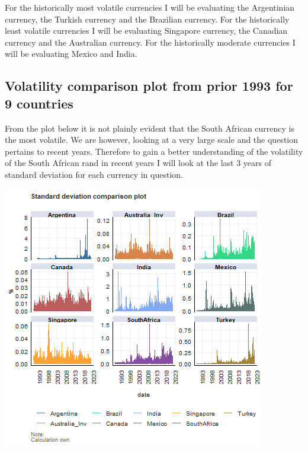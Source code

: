 \documentclass[11pt,preprint, authoryear]{elsarticle}
\let\origfigure\figure
\let\endorigfigure\endfigure
\renewenvironment{figure}[1][2] {
    \expandafter\origfigure\expandafter[H]
} {
    \endorigfigure
}
\numberwithin{equation}{section}
\numberwithin{figure}{section}
\numberwithin{table}{section}
\begin{document}
For the historically most volatile currencies I will be evaluating the
Argentinian currency, the Turkish currency and the Brazilian currency.
For the historically least volatile currencies I will be evaluating
Singapore currency, the Canadian currency and the Australian currency.
For the historically moderate currencies I will be evaluating Mexico and
India.

\hypertarget{volatility-comparison-plot-from-prior-1993-for-9-countries}{%
\subsection{Volatility comparison plot from prior 1993 for 9
countries}\label{volatility-comparison-plot-from-prior-1993-for-9-countries}}

From the plot below it is not plainly evident that the South African
currency is the most volatile. We are however, looking at a very large
scale and the question pertains to recent years. Therefore to gain a
better understanding of the volatility of the South African rand in
recent years I will look at the last 3 years of standard deviation for
each currency in question.

\begin{figure}[H]

{\centering \includegraphics{Question-5_files/figure-latex/Figure 1-1} 

}

\caption{Long term volatility comparison plot \label{Figure1}}\label{fig:Figure 1}
\end{figure}
\end{document}
